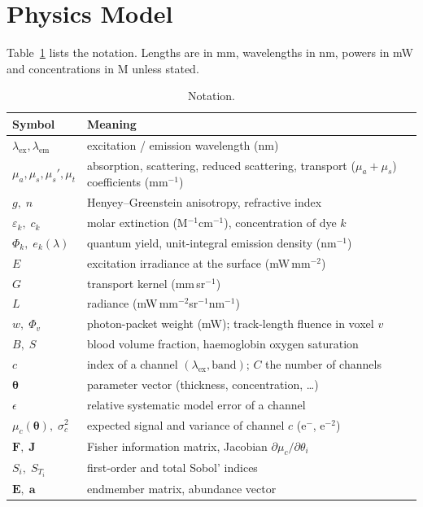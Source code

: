 \documentclass[journal]{IEEEtran}
\newcommand{\mua}{\mu_a}
\newcommand{\mus}{\mu_s}
\newcommand{\musp}{\mu_s'}
\newcommand{\mut}{\mu_t}
\newcommand{\lex}{\lambda_{\mathrm{ex}}}
\newcommand{\lem}{\lambda_{\mathrm{em}}}
\begin{document}
\section{Physics Model}
\label{sec:physics}
Table~\ref{tab:notation} lists the notation. Lengths are in mm, wavelengths in nm, powers in mW and concentrations in \textmu M unless stated.

\begin{table}[!t]
\caption{Notation.}
\label{tab:notation}
\centering\small
\begin{tabular}{@{}l p{}@{}}
\toprule
Symbol & Meaning\\
\midrule
$\lex,\lem$ & excitation / emission wavelength (nm)\\
$\mua,\mus,\musp,\mut$ & absorption, scattering, reduced scattering, transport ($\mua+\mus$) coefficients (mm$^{-1}$)\\
$g,\;n$ & Henyey--Greenstein anisotropy, refractive index\\
$\varepsilon_k,\;c_k$ & molar extinction (M$^{-1}$cm$^{-1}$), concentration of dye $k$\\
$\Phi_k,\;e_k(\lambda)$ & quantum yield, unit-integral emission density (nm$^{-1}$)\\
$E$ & excitation irradiance at the surface (mW\,mm$^{-2}$)\\
$G$ & transport kernel (mm\,sr$^{-1}$)\\
$L$ & radiance (mW\,mm$^{-2}$sr$^{-1}$nm$^{-1}$)\\
$w,\;\Phi_v$ & photon-packet weight (mW); track-length fluence in voxel $v$\\
$B,\;S$ & blood volume fraction, haemoglobin oxygen saturation\\
$c$ & index of a channel $(\lex,\text{band})$; $C$ the number of channels\\
$\boldsymbol\theta$ & parameter vector (thickness, concentration, \dots)\\
$\epsilon$ & relative systematic model error of a channel\\
$\mu_c(\boldsymbol\theta),\;\sigma_c^2$ & expected signal and variance of channel $c$ (e$^-$, e$^{-2}$)\\
$\mathbf F,\;\mathbf J$ & Fisher information matrix, Jacobian $\partial\mu_c/\partial\theta_i$\\
$S_i,\;S_{T_i}$ & first-order and total Sobol' indices\\
$\mathbf E,\;\mathbf a$ & endmember matrix, abundance vector\\
\bottomrule
\end{tabular}
\end{table}
\end{document}
